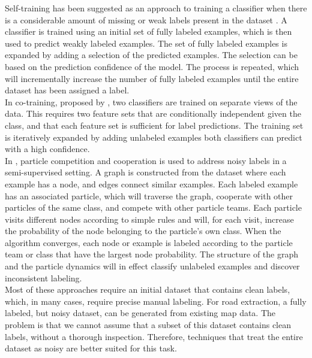 Self-training has been suggested as an approach to training a classifier when there is a considerable amount of missing or weak labels present in the dataset \citep{Rosenberg_self-training}. A classifier is trained using an initial set of fully labeled examples, which is then used to predict weakly labeled examples. The set of fully labeled examples is expanded by adding a selection of the predicted examples. The selection can be based on the prediction confidence of the model. The process is repeated, which will incrementally increase the number of fully labeled examples until the entire dataset has been assigned a label. \\

In co-training, proposed by \cite{Blum_co-training}, two classifiers are trained on separate views of the data. This requires two feature sets that are conditionally independent given the class, and that each feature set is sufficient for label predictions. The training set is iteratively expanded by adding unlabeled examples both classifiers can predict with a high confidence. \\

In \citep{Breve_particle}, particle competition and cooperation is used to address noisy labels in a semi-supervised setting. A graph is constructed from the dataset where each example has a node, and edges connect similar examples. Each labeled example has an associated particle, which will traverse the graph, cooperate with other particles of the same class, and compete with other particle teams. Each particle visits different nodes according to simple rules and will, for each visit, increase the probability of the node belonging to the particle's own class. When the algorithm converges, each node or example is labeled according to the particle team or class that have  the largest node probability. The structure of the graph and the particle dynamics will in effect classify unlabeled examples and discover inconsistent labeling. \\

Most of these approaches require an initial dataset that contains clean labels, which, in many cases, require precise manual labeling. For road extraction, a fully labeled, but noisy dataset, can be generated from existing map data. The problem is that we cannot assume that a subset of this dataset contains clean labels, without a thorough inspection. Therefore, techniques that treat the entire dataset as noisy are better suited for this task. 

